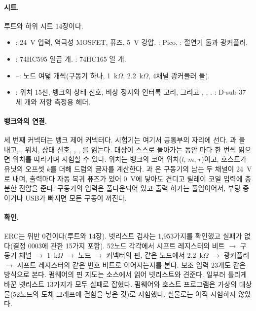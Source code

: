 \paragraph{시트.} 루트와 하위 시트 14장이다.
\begin{itemize}
\item {}: 24~V 입력, 역극성 MOSFET, 퓨즈, 5~V 강압. : Pico. : 절연기 둘과
 광커플러.
\item {}: 74HC595 일곱 개. : 74HC165 열 개.
\item {}--: 노드 여덟 개씩(구동기 하나, 1~k$\Omega$, 2.2~k$\Omega$, 4채널 광커플러 둘).
\item {}: 위치 15선, 뱅크의 상태 신호, 비상 정지와 인터록 고리, 그리고 ,
, . : D-sub 37 세 개와 저항 측정용 헤더.
\end{itemize}

\paragraph{뱅크와의 연결.} 세 번째 커넥터는 뱅크 제어 커넥터다. 시험기는 여기서 공통부의 자리에 선다.
과 을 내고, , 위치, 상태 신호, , , 를
읽는다. 대상이 스스로 돌아가는 동안 마다 한 번씩 읽으면 위치를 따라가며 시험할 수 있다. 위치는 뱅크의
코어 위치($l$, $m$, $r$)이고, 호스트가 유닛의 오프셋 $k$를 더해 드럼의 글자를 계산한다. 과 은
구동기의 남는 두 채널이 24~V로 내며, 출력마다 자동 복귀 퓨즈가 있어 0~V에 닿아도 견디고 릴레이 코일 입력에 충분한
전압을 준다. 구동기의 입력은 풀다운되어 있고 출력 허가는 풀업이어서, 부팅 중이거나 USB가 빠지면 모든 구동이
꺼진다.

\paragraph{확인.} ERC는 위반 0건이다(루트와 14장). 넷리스트 검사는 1,953가지를 확인했고 실패가 없다(결정 0003에
관한 15가지 포함). 52노드 각각에서 시프트 레지스터의 비트 $\to$ 구동기 채널 $\to$ 1~k$\Omega$ $\to$ 노드 $\to$
커넥터의 핀, 같은 노드에서 2.2~k$\Omega$ $\to$ 광커플러 $\to$ 시프트 레지스터의 같은 번호 비트로 이어지는지를 본다.
보조 입력 23개도 같은 방식으로 본다. 펌웨어의 핀 지도는 소스에서 읽어 넷리스트와 견준다. 일부러 틀리게 바꾼
넷리스트 13가지가 모두 실패로 잡혔다. 펌웨어와 호스트 프로그램은 가상의 대상물(52노드의 도체 그래프에 결함을 넣은
것)로 시험했다. 실물로는 아직 시험하지 않았다.

